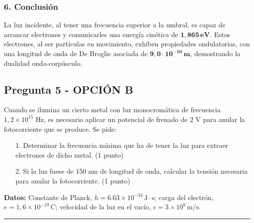 \subsubsection*{6. Conclusión}
\begin{cajaconclusion}
La luz incidente, al tener una frecuencia superior a la umbral, es capaz de arrancar electrones y comunicarles una energía cinética de $\mathbf{1,865 \, eV}$. Estos electrones, al ser partículas en movimiento, exhiben propiedades ondulatorias, con una longitud de onda de De Broglie asociada de $\mathbf{9,0 \cdot 10^{-10} \, m}$, demostrando la dualidad onda-corpúsculo.
\end{cajaconclusion}

\newpage

\subsection{Pregunta 5 - OPCIÓN B}
\label{subsec:5B_2002_jun_ord}

\begin{cajaenunciado}
Cuando se ilumina un cierto metal con luz monocromática de frecuencia $1,2\times10^{15}$ Hz, es necesario aplicar un potencial de frenado de 2 V para anular la fotocorriente que se produce. Se pide:
\begin{enumerate}
    \item[1.] Determinar la frecuencia mínima que ha de tener la luz para extraer electrones de dicho metal. (1 punto)
    \item[2.] Si la luz fuese de 150 nm de longitud de onda, calcular la tensión necesaria para anular la fotocorriente. (1 punto)
\end{enumerate}
\textbf{Datos:} Constante de Planck, $h=6.63\times10^{-34}\,\text{J}\cdot\text{s}$; carga del electrón, $e=1,6\times10^{-19}\,\text{C}$; velocidad de la luz en el vacío, $c=3\times10^8\,\text{m/s}$.
\end{cajaenunciado}
\hrule

